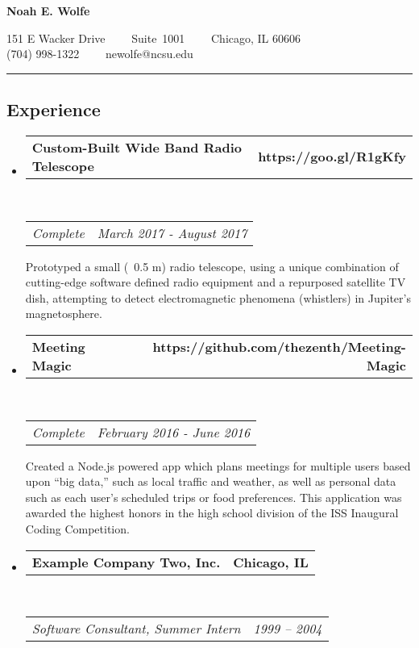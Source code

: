 \documentclass[10pt,letterpaper]{article}
\makeatletter
\newcommand{\headerrow}[2]
{\begin{tabular*}{\linewidth}{l@{\extracolsep{\fill}}r}
	#1 &
	#2 \\
\end{tabular*}}
\makeatother
\begin{document}
\begin{center}
{\LARGE \textbf{Noah E. Wolfe}}

151 E Wacker Drive\ \ \textbullet
\ \ Suite\ 1001\ \ \textbullet
\ \ Chicago, IL 60606
\\
(704) 998-1322\ \ \textbullet
\ \ newolfe@ncsu.edu
\end{center}

\hrule
\vspace{-0.4em}
\subsection*{Experience}

\begin{itemize}
	\parskip=0.1em

	\item
	\headerrow
		{\textbf{Custom-Built Wide Band Radio Telescope}}
		{\textbf{https://goo.gl/R1gKfy}}
	\\
	\headerrow
		{\emph{Complete}}
		{\emph{March 2017 - August 2017}}
	\begin{itemize*}
		Prototyped a small (~0.5 m) radio telescope, using a unique combination of cutting-edge software defined radio equipment and a repurposed satellite TV dish, attempting to detect electromagnetic phenomena (whistlers) in Jupiter’s magnetosphere.
	\end{itemize*}

	\item
	\headerrow
		{\textbf{Meeting Magic}}
		{\textbf{https://github.com/thezenth/Meeting-Magic}}
	\\
	\headerrow
		{\emph{Complete}}
		{\emph{February 2016 - June 2016}}
	\begin{itemize*}
		Created a Node.js powered app which plans meetings for multiple users based upon “big data,” such as local traffic and weather, as well as personal data such as each user’s scheduled trips or food preferences. This application was awarded the highest honors in the high school division of the ISS Inaugural Coding Competition.
	\end{itemize*}

	\item
	\headerrow
		{\textbf{Example Company Two, Inc.}}
		{\textbf{Chicago, IL}}
	\\
	\headerrow
		{\emph{Software Consultant, Summer Intern}}
		{\emph{1999 -- 2004}}

\end{itemize}
\end{document}
